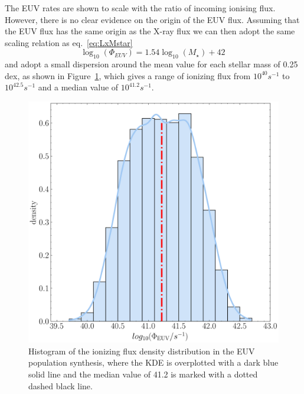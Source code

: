 \documentclass[fleqn,usenatbib,letters]{mnras}
\begin{document}
The EUV rates are shown to scale with the ratio of incoming ionising flux. However, there is no clear evidence on the origin of the EUV flux. Assuming that the EUV flux has the same origin as the X-ray flux we can then adopt the same scaling relation as eq.~\ref{eq:LxMstar}
\begin{equation} \label{eq:PhiEUVMstar}
    \log_{10}(\Phi_{EUV}) = 1.54 \log_{10}(M_\star) + 42 \,
\end{equation}
and adopt a small dispersion around the mean value for each stellar mass of 0.25 dex, as shown in Figure~\ref{fig:phiEUV}, which gives a range of ionizing flux from $10^{40} s^{-1}$ to $10^{42.5} s^{-1}$ and a median value of $10^{41.2} s^{-1}$.
\begin{figure}
    \includegraphics[width=\columnwidth]{Fig4}
    \caption{Histogram of the ionizing flux density distribution in the EUV population synthesis, where the KDE is overplotted with a dark blue solid line and the median value of 41.2 is marked with a dotted dashed black line. \label{fig:phiEUV}}
\end{figure}
\end{document}
